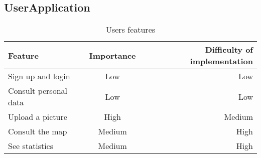         \subsection{UserApplication}
        \begin{table}[h!]
            \begin{center}
            
            \begin{tabular}{l|c|r} %
                \textbf{Feature} & \textbf{Importance} & \textbf{Difficulty of implementation}\\
                
                \hline
                Sign up and login & Low & Low\\
                Consult personal data & Low & Low\\
                Upload a picture & High & Medium\\
                Consult the map & Medium & High\\
                See statistics & Medium & High\\

            \end{tabular}
            \caption{Users features}
            \label{tab:table1}
            \end{center}
        \end{table}

